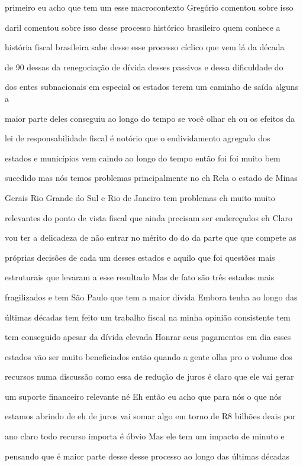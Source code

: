\documentclass[a4paper,12pt]{article}
\begin{document}
primeiro eu acho que tem um esse macrocontexto Gregório comentou sobre isso

daril comentou sobre isso desse processo histórico brasileiro quem conhece a

história fiscal brasileira sabe desse esse processo cíclico que vem lá da década

de 90 dessas da renegociação de dívida desses passivos e dessa dificuldade do

dos entes subnacionais em especial os estados terem um caminho de saída alguns a

maior parte deles conseguiu ao longo do tempo se você olhar eh ou os efeitos da

lei de responsabilidade fiscal é notório que o endividamento agregado dos

estados e municípios vem caindo ao longo do tempo então foi foi muito bem

sucedido mas nós temos problemas principalmente no eh Rela o estado de Minas

Gerais Rio Grande do Sul e Rio de Janeiro tem problemas eh muito muito

relevantes do ponto de vista fiscal que ainda precisam ser endereçados eh Claro

vou ter a delicadeza de não entrar no mérito do do da parte que que compete as

próprias decisões de cada um desses estados e aquilo que foi questões mais

estruturais que levaram a esse resultado Mas de fato são três estados mais

fragilizados e tem São Paulo que tem a maior dívida Embora tenha ao longo das

últimas décadas tem feito um trabalho fiscal na minha opinião consistente tem

tem conseguido apesar da dívida elevada Honrar seus pagamentos em dia esses

estados vão ser muito beneficiados então quando a gente olha pro o volume dos

recursos numa discussão como essa de redução de juros é claro que ele vai gerar

um suporte financeiro relevante né Eh então eu acho que para nós o que nós

estamos abrindo de eh de juros vai somar algo em torno de R8 bilhões deais por

ano claro todo recurso importa é óbvio Mas ele tem um impacto de minuto e

pensando que é maior parte desse desse processo ao longo das últimas décadas
\end{document}
